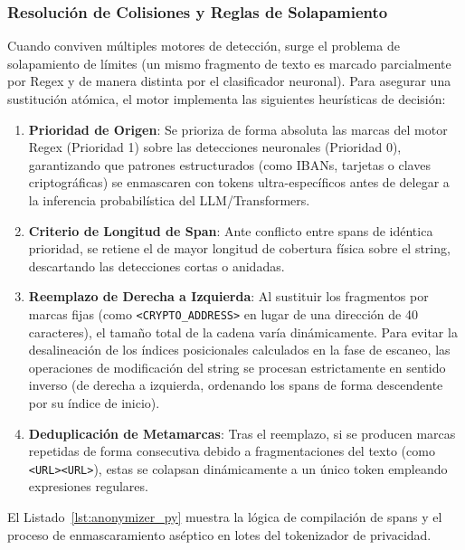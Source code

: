 \subsubsection{Resolución de Colisiones y Reglas de Solapamiento}
Cuando conviven múltiples motores de detección, surge el problema de solapamiento de límites (un mismo fragmento de texto es marcado parcialmente por Regex y de manera distinta por el clasificador neuronal). Para asegurar una sustitución atómica, el motor implementa las siguientes heurísticas de decisión:
\begin{enumerate}
    \item \textbf{Prioridad de Origen}: Se prioriza de forma absoluta las marcas del motor Regex (Prioridad 1) sobre las detecciones neuronales (Prioridad 0), garantizando que patrones estructurados (como IBANs, tarjetas o claves criptográficas) se enmascaren con tokens ultra-específicos antes de delegar a la inferencia probabilística del LLM/Transformers.
    \item \textbf{Criterio de Longitud de Span}: Ante conflicto entre spans de idéntica prioridad, se retiene el de mayor longitud de cobertura física sobre el string, descartando las detecciones cortas o anidadas.
    \item \textbf{Reemplazo de Derecha a Izquierda}: Al sustituir los fragmentos por marcas fijas (como \texttt{<CRYPTO\_ADDRESS>} en lugar de una dirección de 40 caracteres), el tamaño total de la cadena varía dinámicamente. Para evitar la desalineación de los índices posicionales calculados en la fase de escaneo, las operaciones de modificación del string se procesan estrictamente en sentido inverso (de derecha a izquierda, ordenando los spans de forma descendente por su índice de inicio).
    \item \textbf{Deduplicación de Metamarcas}: Tras el reemplazo, si se producen marcas repetidas de forma consecutiva debido a fragmentaciones del texto (como \texttt{<URL><URL>}), estas se colapsan dinámicamente a un único token empleando expresiones regulares.
\end{enumerate}

El Listado~\ref{lst:anonymizer_py} muestra la lógica de compilación de spans y el proceso de enmascaramiento aséptico en lotes del tokenizador de privacidad.

